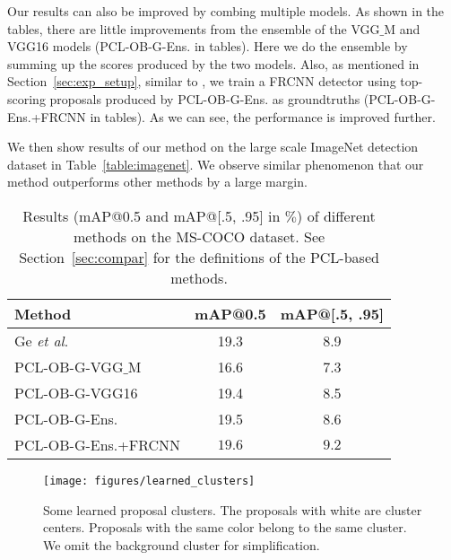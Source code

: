 \documentclass[10pt,journal,compsoc]{IEEEtran}
\def\methodname{PCL}
\def\etal{\emph{et al}.}
\begin{document}
Our results can also be improved by combing multiple models.
As shown in the tables, there are little improvements from the ensemble of the VGG$\_$M and VGG16 models (\methodname-OB-G-Ens. in tables).
Here we do the ensemble by summing up the scores produced by the two models.
Also, as mentioned in Section~\ref{sec:exp_setup},
similar to \cite{Ref:Li2016,Ref:Diba2017,Ref:Jie2017},
we train a FRCNN detector using top-scoring proposals produced by \methodname-OB-G-Ens. as groundtruths (\methodname-OB-G-Ens.+FRCNN in tables).
As we can see, the performance is improved further.

We then show results of our method on the large scale ImageNet detection dataset in Table~\ref{table:imagenet}.
We observe similar phenomenon that our method outperforms other methods by a large margin.


\begin{table}[t]
\caption{Results (mAP@0.5 and mAP@[.5, .95] in $\%$) of different methods on the MS-COCO dataset.
See Section~\ref{sec:compar} for the definitions of the \methodname-based methods.}{
\begin{center}
\footnotesize
\begin{tabular}{|l|c|c|}
  \hline
  Method & mAP@0.5 & mAP@[.5, .95] \\
  \hline
  \hline
  Ge \etal\ \cite{Ref:Ge2018} & 19.3 & 8.9 \\
  \hline
  \methodname-OB-G-VGG$\_$M & 16.6 & 7.3 \\
  \methodname-OB-G-VGG16 & 19.4 & 8.5 \\
  \methodname-OB-G-Ens. & 19.5 & 8.6 \\
  \methodname-OB-G-Ens.+FRCNN & $\bm{19.6}$ & $\bm{9.2}$ \\
  \hline
\end{tabular}
\end{center}}
\label{table:coco}
\end{table}



\begin{figure}[t]
\begin{center}
   \texttt{[image: figures/learned\_clusters]}
\end{center}
   \caption{Some learned proposal clusters.
   The proposals with white are cluster centers.
   Proposals with the same color belong to the same cluster.
   We omit the background cluster for simplification.}
\label{fig:learned_clusters}
\end{figure}
\end{document}
